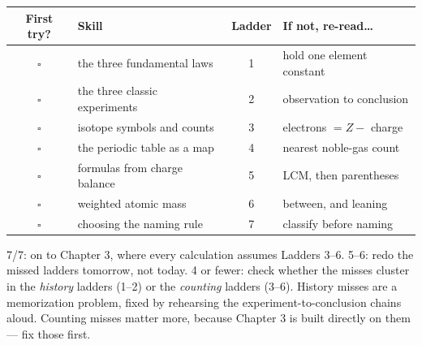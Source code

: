 \documentclass{apchem-worksheet}
\begin{document}
\renewcommand{\arraystretch}{1.35}
\noindent\begin{tabular}{@{}c p{6.4cm} c p{4.6cm}@{}}
\toprule
\textbf{First try?} & \textbf{Skill} & \textbf{Ladder} &
  \textbf{If not, re-read\ldots}\\
\midrule
$\square$ & the three fundamental laws & 1 & hold one element constant \\
$\square$ & the three classic experiments & 2 & observation to
  conclusion \\
$\square$ & isotope symbols and counts & 3 & electrons $= Z -$ charge \\
$\square$ & the periodic table as a map & 4 & nearest noble-gas count \\
$\square$ & formulas from charge balance & 5 & LCM, then parentheses \\
$\square$ & weighted atomic mass & 6 & between, and leaning \\
$\square$ & choosing the naming rule & 7 & classify before naming \\
\bottomrule
\end{tabular}

\begin{apcnote}
7/7: on to Chapter 3, where every calculation assumes Ladders 3--6.
5--6: redo the missed ladders tomorrow, not today. 4 or fewer: check
whether the misses cluster in the \emph{history} ladders (1--2) or the
\emph{counting} ladders (3--6). History misses are a memorization problem,
fixed by rehearsing the experiment-to-conclusion chains aloud. Counting
misses matter more, because Chapter 3 is built directly on them --- fix
those first.
\end{apcnote}
\end{document}
